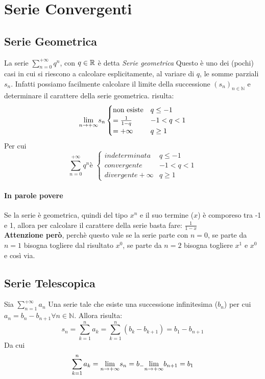 \documentclass[12pt, a4paper, openany]{book}
\begin{document}
\section{Serie Convergenti}
\subsection{Serie Geometrica}
La serie $\sum_{n=0}^{+\infty} q^n$, con $q \in \mathbb{R}$ è detta \emph{Serie geometrica}
Questo è uno dei (pochi) casi in cui si riescono a calcolare esplicitamente, al variare di $q$, le somme parziali $s_n$.
Infatti possiamo facilmente calcolare il limite della successione $(s_n)_{n\in \mathbb{N}}$ e determinare il carattere della serie geometrica. 
risulta:
\begin{equation}
    \underset{n \to +\infty}{\lim} s_n \begin{cases}
        \text{non esiste} & q \leq -1 \\
        = \frac{1}{1-q} & -1 < q < 1 \\
        = +\infty & q \geq 1
    \end{cases}
\end{equation}
Per cui 
\begin{equation}
    \sum_{n=0}^{+\infty} q^n \text{è } \begin{cases}
        indeterminata & q \leq -1 \\
        convergente & -1 < q < 1 \\
        divergente +\infty & q \geq 1
    \end{cases}
\end{equation}


\paragraph{In parole povere}
Se la serie è geometrica, quindi del tipo $x^n$ e il suo termine ($x$) è comporeso tra -1 e 1, allora per calcolare il carattere della serie basta fare: $\frac{1}{1-x}$
\\ \textbf{Attenzione però}, perchè questo vale se la serie parte con $n=0$, se parte da $n=1$ bisogna togliere dal risultato $x^0$, se parte da $n=2$ bisogna togliere $x^1$ e $x^0$ e così via.

\subsection{Serie Telescopica}
Sia $\sum_{n=1}^{+\infty} a_n$ Una serie tale che esiste una successione infinitesima ($b_n$) per cui $a_n = b_n - b_{n+1} \forall n\in \mathbb{N}$.
Allora risulta:
\begin{equation*}
    s_n = \sum_{k=1}^{n}a_k = \sum_{k=1}^n (b_k - b_{k+1}) = b_1 - b_{n+1}
\end{equation*}
Da cui
\begin{equation*}
    \sum_{k=1}^{n}a_k = \underset{n \to +\infty}{\lim} s_n = b_ - \underset{n \to +\infty}{\lim} b_{n+1} = b_1
\end{equation*}
\end{document}
